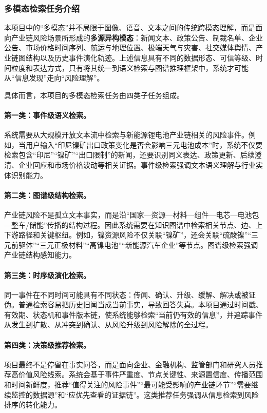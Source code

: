 \documentclass[12pt,a4paper]{article}
\newcommand{\term}[1]{\textbf{#1}}
\begin{document}
\subsubsection{多模态检索任务介绍}

本项目中的“多模态”并不局限于图像、语音、文本之间的传统跨模态理解，而是面向产业链风险场景所形成的\term{多源异构模态}：新闻文本、政策公告、制裁名单、企业公告、市场价格时间序列、航运与地理位置、极端天气与灾害、社交媒体舆情、产业链图结构以及历史事件演化轨迹。上述信息具有不同的数据形态、可信等级、时间粒度和表达方式，只有将其统一到语义检索与图谱推理框架中，系统才可能从“信息发现”走向“风险理解”。

具体而言，本项目的多模态检索任务由四类子任务组成。

\paragraph{第一类：事件级语义检索。}系统需要从大规模开放文本流中检索与新能源锂电池产业链相关的风险事件。例如，当用户输入“印尼镍矿出口政策变化是否会影响三元电池成本”时，系统不仅要检索包含“印尼”“镍矿”“出口限制”的新闻，还要识别同义表达、政策更新、后续澄清、企业回应和市场价格波动等相关证据。事件级检索强调文本语义理解与行业实体识别能力。

\paragraph{第二类：图谱级结构检索。}产业链风险不是孤立文本事实，而是沿“国家—资源—材料—组件—电芯—电池包—整车/储能”传播的结构过程。因此系统需要在知识图谱中检索相关节点、边、上下游路径和关键枢纽。例如，镍资源风险不仅关联“镍矿”，还会关联“硫酸镍”“三元前驱体”“三元正极材料”“高镍电池”“新能源汽车企业”等节点。图谱级检索强调产业链结构感知能力。

\paragraph{第三类：时序级演化检索。}同一事件在不同时间可能具有不同状态：传闻、确认、升级、缓解、解决或被证伪。普通检索容易把历史旧闻当成当前事实，导致回答失真。本项目通过时间戳、有效期、状态机和事件版本链，使系统能够检索“当前仍有效的信息”，并追踪事件从发生到扩散、从冲突到确认、从风险升级到风险解除的全过程。

\paragraph{第四类：决策级推荐检索。}项目最终不是停留在事实问答，而是面向企业、金融机构、监管部门和研究人员推荐高价值风险线索。系统会基于事件严重度、节点关键性、来源置信度、传播范围和时间新鲜度，推荐“值得关注的风险事件”“最可能受影响的产业链环节”“需要继续监控的数据源”和“应优先查看的证据链”。这类推荐任务强调从信息检索到风险排序的转化能力。
\end{document}
